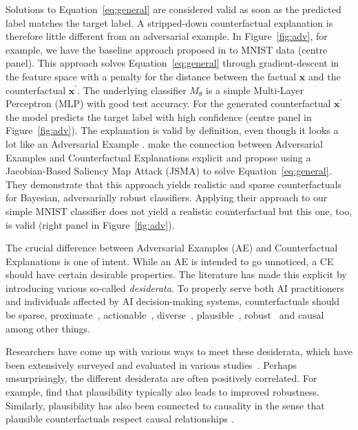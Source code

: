 \documentclass{article}
\begin{document}
Solutions to Equation~\ref{eq:general} are considered valid as soon as the predicted label matches the target label. A stripped-down counterfactual explanation is therefore little different from an adversarial example. In Figure~\ref{fig:adv}, for example, we have the baseline approach proposed in \citet{wachter2017counterfactual} to MNIST data (centre panel). This approach solves Equation~\ref{eq:general} through gradient-descent in the feature space with a penalty for the distance between the factual $\mathbf{x}$ and the counterfactual $\mathbf{x}^{\prime}$. The underlying classifier $M_{\theta}$ is a simple Multi-Layer Perceptron (MLP) with good test accuracy. For the generated counterfactual $\mathbf{x}^{\prime}$ the model predicts the target label with high confidence (centre panel in Figure~\ref{fig:adv}). The explanation is valid by definition, even though it looks a lot like an Adversarial Example \citep{goodfellow2014explaining}. \citet{schut2021generating} make the connection between Adversarial Examples and Counterfactual Explanations explicit and propose using a Jacobian-Based Saliency Map Attack (JSMA) to solve Equation~\ref{eq:general}. They demonstrate that this approach yields realistic and sparse counterfactuals for Bayesian, adversarially robust classifiers. Applying their approach to our simple MNIST classifier does not yield a realistic counterfactual but this one, too, is valid (right panel in Figure~\ref{fig:adv}). 

The crucial difference between Adversarial Examples (AE) and Counterfactual Explanations is one of intent. While an AE is intended to go unnoticed, a CE should have certain desirable properties. The literature has made this explicit by introducing various so-called \textit{desiderata}. To properly serve both AI practitioners and individuals affected by AI decision-making systems, counterfactuals should be sparse, proximate~\citep{wachter2017counterfactual}, actionable~\citep{ustun2019actionable}, diverse~\citep{mothilal2020explaining}, plausible~\citep{joshi2019realistic,poyiadzi2020face,schut2021generating}, robust~\citep{upadhyay2021robust,pawelczyk2022probabilistically,altmeyer2023endogenous} and causal~\citep{karimi2021algorithmic} among other things. 

Researchers have come up with various ways to meet these desiderata, which have been extensively surveyed and evaluated in various studies~\citep{verma2020counterfactual,karimi2020survey,pawelczyk2021carla,artelt2021evaluating,guidotti2022counterfactual}. Perhaps unsurprisingly, the different desiderata are often positively correlated. For example, \citet{artelt2021evaluating} find that plausibility typically also leads to improved robustness. Similarly, plausibility has also been connected to causality in the sense that plausible counterfactuals respect causal relationships \citep{mahajan2020preserving}. 
\end{document}

